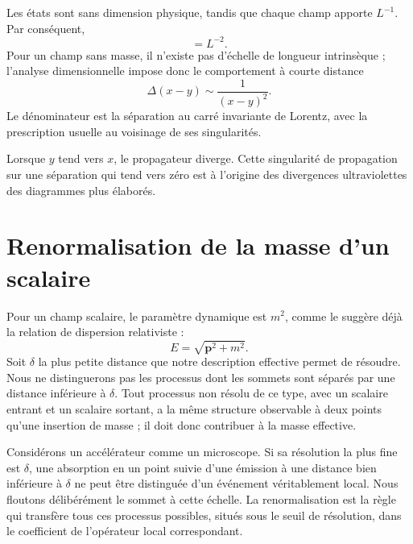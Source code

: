 Les états sont sans dimension physique, tandis que chaque champ apporte \(L^{-1}\). Par conséquent,
\begin{equation}
[\Delta]=L^{-2}.
\end{equation}
Pour un champ sans masse, il n’existe pas d’échelle de longueur intrinsèque ; l’analyse dimensionnelle impose donc le comportement à courte distance
\begin{equation}
\Delta(x-y)\sim\frac{1}{(x-y)^2}.
\label{eq:massless-propagator}
\end{equation}
Le dénominateur est la séparation au carré invariante de Lorentz, avec la prescription usuelle au voisinage de ses singularités.

Lorsque \(y\) tend vers \(x\), le propagateur diverge. Cette singularité de propagation sur une séparation qui tend vers zéro est à l’origine des divergences ultraviolettes des diagrammes plus élaborés.

\section{Renormalisation de la masse d’un scalaire}

Pour un champ scalaire, le paramètre dynamique est \(m^2\), comme le suggère déjà la relation de dispersion relativiste :
\begin{equation}
E=\sqrt{\mathbf p^2+m^2}.
\end{equation}
Soit \(\delta\) la plus petite distance que notre description effective permet de résoudre. Nous ne distinguerons pas les processus dont les sommets sont séparés par une distance inférieure à \(\delta\). Tout processus non résolu de ce type, avec un scalaire entrant et un scalaire sortant, a la même structure observable à deux points qu’une insertion de masse ; il doit donc contribuer à la masse effective.

Considérons un accélérateur comme un microscope. Si sa résolution la plus fine est \(\delta\), une absorption en un point suivie d’une émission à une distance bien inférieure à \(\delta\) ne peut être distinguée d’un événement véritablement local. Nous floutons délibérément le sommet à cette échelle. La renormalisation est la règle qui transfère tous ces processus possibles, situés sous le seuil de résolution, dans le coefficient de l’opérateur local correspondant.

